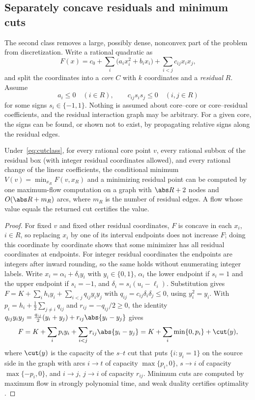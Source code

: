\subsection{Separately concave residuals and minimum cuts}\label{sec:cuts}
The second class removes a large, possibly dense, nonconvex part of the
problem from discretization. Write a rational quadratic as
\begin{equation}\label{eq:cutquad}
F(x)=c_0+\sum_i\bigl(a_ix_i^2+b_ix_i\bigr)+\sum_{i<j}c_{ij}x_ix_j,
\end{equation}
and split the coordinates into a \emph{core} $C$ with $k$ coordinates and a
\emph{residual} $R$. Assume
\begin{equation}\label{eq:cutclass}
a_i\le0\quad(i\in R),\qquad c_{ij}s_is_j\le0\quad(i,j\in R)
\end{equation}
for some signs $s_i\in\{-1,1\}$. Nothing is assumed about core--core or
core--residual coefficients, and the residual interaction graph may be
arbitrary. For a given core, the signs can be found, or shown not to
exist, by propagating relative signs along the residual edges.

\begin{proposition}\label{prop:cut}
Under~\eqref{eq:cutclass}, for every rational core point $v$, every
rational subbox of the residual box (with integer residual coordinates
allowed), and every rational change of the linear coefficients, the
conditional minimum $V(v)=\min_{x_R}F(v,x_R)$ and a minimizing residual
point can be computed by one maximum-flow computation on a graph with
$\abs R+2$ nodes and $O(\abs R+m_R)$ arcs, where $m_R$ is the number of
residual edges. A flow whose value equals the returned cut certifies the
value.
\end{proposition}

\begin{proof}
For fixed $v$ and fixed other residual coordinates, $F$ is concave in each
$x_i$, $i\in R$, so replacing $x_i$ by one of its interval endpoints does
not increase $F$; doing this coordinate by coordinate shows that some
minimizer has all residual coordinates at endpoints. For integer residual
coordinates the endpoints are integers after inward rounding, so the same
holds without enumerating integer labels. Write
$x_i=\alpha_i+\delta_iy_i$ with $y_i\in\{0,1\}$, $\alpha_i$ the lower endpoint
if $s_i=1$ and the upper endpoint if $s_i=-1$, and
$\delta_i=s_i(u_i-\ell_i)$. Substitution gives
$F=K+\sum_ih_iy_i+\sum_{i<j}q_{ij}y_iy_j$ with $q_{ij}=c_{ij}\delta_i\delta_j\le0$,
using $y_i^2=y_i$. With $p_i=h_i+\frac12\sum_{j\ne i}q_{ij}$ and
$r_{ij}=-q_{ij}/2\ge0$, the identity
$q_{ij}y_iy_j=\frac{q_{ij}}2(y_i+y_j)+r_{ij}\abs{y_i-y_j}$ gives
\[
F=K+\sum_ip_iy_i+\sum_{i<j}r_{ij}\abs{y_i-y_j}
=K+\sum_i\min\{0,p_i\}+\cut(y),
\]
where $\cut(y)$ is the capacity of the $s$--$t$ cut that puts $\{i:y_i=1\}$
on the source side in the graph with arcs $i\to t$ of capacity
$\max\{p_i,0\}$, $s\to i$ of capacity $\max\{-p_i,0\}$, and $i\to j$, $j\to i$
of capacity $r_{ij}$. Minimum cuts are computed by maximum flow in strongly
polynomial time, and weak duality certifies optimality
\cite{KolmogorovZabih2004}.
\end{proof}

